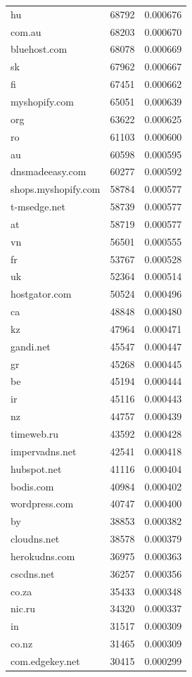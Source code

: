 \begin{tabular}{lrr}
hu & 68792 & 0.000676 \\
com.au & 68203 & 0.000670 \\
bluehost.com & 68078 & 0.000669 \\
sk & 67962 & 0.000667 \\
fi & 67451 & 0.000662 \\
myshopify.com & 65051 & 0.000639 \\
org & 63622 & 0.000625 \\
ro & 61103 & 0.000600 \\
au & 60598 & 0.000595 \\
dnsmadeeasy.com & 60277 & 0.000592 \\
shops.myshopify.com & 58784 & 0.000577 \\
t-msedge.net & 58739 & 0.000577 \\
at & 58719 & 0.000577 \\
vn & 56501 & 0.000555 \\
fr & 53767 & 0.000528 \\
uk & 52364 & 0.000514 \\
hostgator.com & 50524 & 0.000496 \\
ca & 48848 & 0.000480 \\
kz & 47964 & 0.000471 \\
gandi.net & 45547 & 0.000447 \\
gr & 45268 & 0.000445 \\
be & 45194 & 0.000444 \\
ir & 45116 & 0.000443 \\
nz & 44757 & 0.000439 \\
timeweb.ru & 43592 & 0.000428 \\
impervadns.net & 42541 & 0.000418 \\
hubspot.net & 41116 & 0.000404 \\
bodis.com & 40984 & 0.000402 \\
wordpress.com & 40747 & 0.000400 \\
by & 38853 & 0.000382 \\
cloudns.net & 38578 & 0.000379 \\
herokudns.com & 36975 & 0.000363 \\
cscdns.net & 36257 & 0.000356 \\
co.za & 35433 & 0.000348 \\
nic.ru & 34320 & 0.000337 \\
in & 31517 & 0.000309 \\
co.nz & 31465 & 0.000309 \\
com.edgekey.net & 30415 & 0.000299 \\

\end{tabular}
